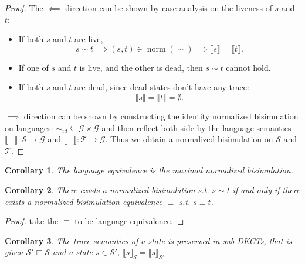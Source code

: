 \documentclass[acmsmall,screen]{acmart}
\newtheorem{corollary}{Corollary}
\DeclareMathOperator{\norm}{\mathrm{norm}}
\begin{document}
\begin{proof}
    The \(⟸\) direction can be shown by case analysis on the liveness of \(s\) and \(t\):
    \begin{itemize}
        \item If both \(s\) and \(t\) are live, 
            \[s ∼ t ⟹ (s, t) ∈ \norm(∼) ⟹ ⟦s⟧ = ⟦t⟧.\]
        \item If one of \(s\) and \(t\) is live, and the other is dead, then \(s ∼ t\) cannot hold.
        \item If both \(s\) and \(t\) are dead, since dead states don't have any trace:
            \[⟦s⟧ = ⟦t⟧ = ∅.\]
    \end{itemize}
    
    \(⟹\) direction can be shown by constructing the identity normalized bisimulation on languages: \({∼_{id}} ⊆ 𝒢 × 𝒢\) and then reflect both side by the language semantics \(⟦-⟧: 𝒮 → 𝒢\) and \(⟦-⟧: 𝒯 → 𝒢\). Thus we obtain a normalized bisimulation on \(𝒮\) and \(𝒯\).
\end{proof}

\begin{corollary}
    The language equivalence is the maximal normalized bisimulation.  
\end{corollary}

\begin{corollary}
    There exists a normalized bisimulation s.t. \(s ∼ t\) if and only if there exists a normalized bisimulation equivalence \(≡\) s.t. \(s ≡ t\).
\end{corollary}

\begin{proof}
    take the \(≡\) to be language equivalence.
\end{proof}

\begin{corollary}
    The trace semantics of a state is preserved in sub-DKCTs, that is given \(𝒮 '⊑ 𝒮\) and a state \(s ∈ 𝒮'\), \(⟦s⟧_{𝒮} = ⟦s⟧_{𝒮'}\)
\end{corollary}
\end{document}
